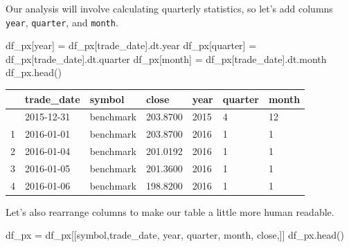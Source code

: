 \documentclass[
  letterpaper,
  DIV=11,
  numbers=noendperiod]{scrreprt}
\newenvironment{Shaded}{\begin{snugshade}}{\end{snugshade}}
\newcommand{\NormalTok}[1]{\textcolor[rgb]{0.00,0.23,0.31}{#1}}
\newcommand{\OperatorTok}[1]{\textcolor[rgb]{0.37,0.37,0.37}{#1}}
\newcommand{\StringTok}[1]{\textcolor[rgb]{0.13,0.47,0.30}{#1}}
\begin{document}
Our analysis will involve calculating quarterly statistics, so let's add
columns \texttt{year}, \texttt{quarter}, and \texttt{month}.

\begin{Shaded}
\begin{Highlighting}[]
\NormalTok{df\_px[}\StringTok{\textquotesingle{}year\textquotesingle{}}\NormalTok{] }\OperatorTok{=}\NormalTok{ df\_px[}\StringTok{\textquotesingle{}trade\_date\textquotesingle{}}\NormalTok{].dt.year}
\NormalTok{df\_px[}\StringTok{\textquotesingle{}quarter\textquotesingle{}}\NormalTok{] }\OperatorTok{=}\NormalTok{ df\_px[}\StringTok{\textquotesingle{}trade\_date\textquotesingle{}}\NormalTok{].dt.quarter}
\NormalTok{df\_px[}\StringTok{\textquotesingle{}month\textquotesingle{}}\NormalTok{] }\OperatorTok{=}\NormalTok{ df\_px[}\StringTok{\textquotesingle{}trade\_date\textquotesingle{}}\NormalTok{].dt.month}
\NormalTok{df\_px.head()}
\end{Highlighting}
\end{Shaded}

\begin{longtable}[]{@{}lllllll@{}}
\toprule\noalign{}
& trade\_date & symbol & close & year & quarter & month \\
\midrule\noalign{}
\endhead
\bottomrule\noalign{}
\endlastfoot
0 & 2015-12-31 & benchmark & 203.8700 & 2015 & 4 & 12 \\
1 & 2016-01-01 & benchmark & 203.8700 & 2016 & 1 & 1 \\
2 & 2016-01-04 & benchmark & 201.0192 & 2016 & 1 & 1 \\
3 & 2016-01-05 & benchmark & 201.3600 & 2016 & 1 & 1 \\
4 & 2016-01-06 & benchmark & 198.8200 & 2016 & 1 & 1 \\
\end{longtable}

Let's also rearrange columns to make our table a little more human
readable.

\begin{Shaded}
\begin{Highlighting}[]
\NormalTok{df\_px }\OperatorTok{=}\NormalTok{ df\_px[[}\StringTok{\textquotesingle{}symbol\textquotesingle{}}\NormalTok{,}\StringTok{\textquotesingle{}trade\_date\textquotesingle{}}\NormalTok{, }\StringTok{\textquotesingle{}year\textquotesingle{}}\NormalTok{, }\StringTok{\textquotesingle{}quarter\textquotesingle{}}\NormalTok{, }\StringTok{\textquotesingle{}month\textquotesingle{}}\NormalTok{,  }\StringTok{\textquotesingle{}close\textquotesingle{}}\NormalTok{,]]}
\NormalTok{df\_px.head()}
\end{Highlighting}
\end{Shaded}
\end{document}
